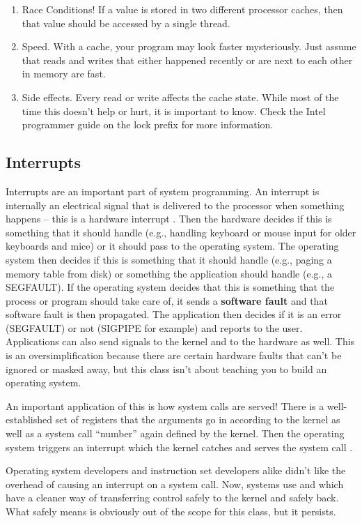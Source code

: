 \begin{enumerate}
\item Race Conditions! If a value is stored in two different processor caches, then that value should be accessed by a single thread.
\item Speed. With a cache, your program may look faster mysteriously. Just assume that reads and writes that either happened recently or are next to each other in memory are fast.
\item Side effects. Every read or write affects the cache state. While most of the time this doesn't help or hurt, it is important to know. Check the Intel programmer guide on the lock prefix for more information.
\end{enumerate}

\subsection{Interrupts}

Interrupts are an important part of system programming.
An interrupt is internally an electrical signal that is delivered to the processor when something happens -- this is a hardware interrupt \cite{redhat_hardware_int}.
Then the hardware decides if this is something that it should handle (e.g., handling keyboard or mouse input for older keyboards and mice) or it should pass to the operating system.
The operating system then decides if this is something that it should handle (e.g., paging a memory table from disk) or something the application should handle (e.g., a SEGFAULT).
If the operating system decides that this is something that the process or program should take care of, it sends a \textbf{software fault} and that software fault is then propagated.
The application then decides if it is an error (SEGFAULT) or not (SIGPIPE for example) and reports to the user.
Applications can also send signals to the kernel and to the hardware as well.
This is an oversimplification because there are certain hardware faults that can't be ignored or masked away, but this class isn't about teaching you to build an operating system.

An important application of this is how system calls are served!
There is a well-established set of registers that the arguments go in according to the kernel as well as a system call ``number'' again defined by the kernel.
Then the operating system triggers an interrupt which the kernel catches and serves the system call \cite{garg_2006}.

Operating system developers and instruction set developers alike didn't like the overhead of causing an interrupt on a system call. Now, systems use  and  which have a cleaner way of transferring control safely to the kernel and safely back.
What safely means is obviously out of the scope for this class, but it persists.
